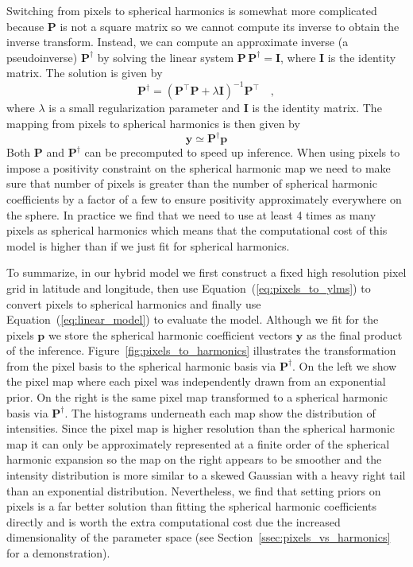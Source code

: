 \documentclass[modern]{aastex62}
\begin{document}
Switching from pixels to spherical harmonics is somewhat more complicated because $\mathbf{P}$ is not a square matrix so we cannot compute its inverse to obtain the inverse transform.
Instead, we can compute an approximate inverse (a pseudoinverse) $\mathbf{P}^\dagger$ by solving the linear system $\mathbf{P}\,\mathbf{P}^\dagger=\mathbf{I}$, where $\mathbf{I}$ is the identity matrix. 
The solution is given by
\begin{equation}
\mathbf{P}^\dagger=\left(\mathbf{P}^{\top} \mathbf{P}+\lambda \mathbf{I}\right)^{-1} \mathbf{P}^{\top}
    \quad,
\end{equation}
where $\lambda$ is a small regularization parameter and $\mathbf{I}$ is the identity matrix.
The mapping from pixels to spherical harmonics is then given by
\begin{equation}
    \mathbf{y}\simeq\mathbf{P}^\dagger\mathbf{p}
    \label{eq:pixels_to_ylms}
\end{equation}
Both $\mathbf{P}$ and $\mathbf{P}^\dagger$ can be precomputed to speed up inference.
When using pixels to impose a positivity constraint on the spherical harmonic map we need to make sure that number of pixels is greater than the number of spherical harmonic coefficients by a factor of a few to ensure positivity approximately everywhere on the sphere.
In practice we find that we need to use at least 4 times as many pixels as spherical harmonics which means that the computational cost of this model is higher than if we just fit for spherical harmonics. 

To summarize, in our hybrid model we first construct a fixed high resolution pixel grid in latitude and longitude, then use Equation~(\ref{eq:pixels_to_ylms}) to convert pixels to spherical harmonics and finally use Equation~(\ref{eq:linear_model}) to evaluate the model.
Although we fit for the pixels $\mathbf{p}$ we store the spherical harmonic coefficient vectors $\mathbf{y}$ as the final product of the inference. 
Figure~\ref{fig:pixels_to_harmonics} illustrates the transformation from the pixel basis to the spherical harmonic basis via $\mathbf{P}^\dagger$.
On the left we show the pixel map where each pixel was independently drawn from an exponential prior. 
On the right is the same pixel map transformed to a spherical harmonic basis via $\mathbf{P}^\dagger$. 
The histograms underneath each map show the distribution of intensities.
Since the pixel map is higher resolution than the spherical harmonic map it can only be approximately represented at a finite order of the spherical harmonic expansion so the map on the right appears to be smoother and the intensity distribution is more similar to a skewed Gaussian with a heavy right tail than an exponential distribution.
Nevertheless, we find that setting priors on pixels is a far better solution than fitting the spherical harmonic coefficients directly and is worth the extra computational cost due the increased dimensionality of the parameter space (see Section~\ref{ssec:pixels_vs_harmonics} for a demonstration).
\end{document}
